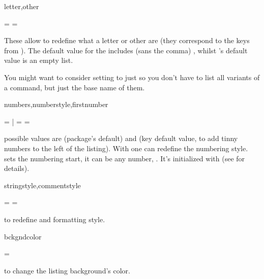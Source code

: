 \documentclass{article}
\begin{document}
\begin{codedescribe}[key,new=2025/05/13]{letter,other}
\begin{codesyntax} %
   = 
   = 
\end{codesyntax}
These allow to redefine what a letter or other are (they correspond to the  keys from ). The default value for the  includes (sans the comma)  , whilst 's default value is an empty list.
\begin{tsremark}
  You might want to consider setting  to just  so you don't have to list all  variants of a command, but just the base name of them.
\end{tsremark}
\end{codedescribe}

\begin{codedescribe}[key,update=2025/12/16]{numbers,numberstyle,firstnumber}
\begin{codesyntax} %
	 =  | 
	 = 
	 = 
\end{codesyntax}
 possible values are  (package's default) and  (key default value, to add tinny numbers to the left of the listing). With  one can redefine the numbering style.  sets the numbering start, it can be any number, . It's initialized with  (see \cite{listings} for details). 
\end{codedescribe}

\begin{codedescribe}[key]{stringstyle,commentstyle}
\begin{codesyntax} %
	 = 
	 = 
\end{codesyntax}
to redefine  and  formatting style.
\end{codedescribe}

\begin{codedescribe}[key]{bckgndcolor}
\begin{codesyntax} %
	 = 
\end{codesyntax}
to change the listing background's color.
\end{codedescribe}
\end{document}
